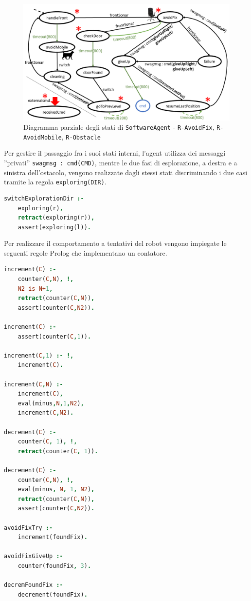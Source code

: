 \documentclass{../llncs}
\newcommand{\codescript}[1]{{\mbox{\small{\texttt{#1}}}}\xspace}
\newcommand{\code}[1]{{\color{blue}\small{\texttt{#1}}}}
\newcommand{\labelfig}[1]{\label{fig:#1}}
\begin{document}
\begin{figure}[!htb]
\centering
\includegraphics[scale=0.4]{img/stateDiagramObstacle.png}
\caption{Diagramma parziale degli stati di \texttt{SoftwareAgent} - \code{R-AvoidFix}, \code{R-AvoidMobile}, \code{R-Obstacle}}\labelfig{obstacleAvoidance}
\end{figure}

Per gestire il passaggio fra i suoi stati interni, l'agent utilizza dei messaggi ''privati'' \codescript{swagmsg : cmd(CMD)}, mentre le due fasi di esplorazione, a destra e a sinistra dell'ostacolo, vengono realizzate dagli stessi stati discriminando i due casi tramite la regola \codescript{exploring(DIR)}.\\

\begin{lstlisting}[language=Prolog, keywordstyle=\color{black}, caption={SoftwareAgent, Rules - pt2}]
switchExplorationDir :-
	exploring(r),
	retract(exploring(r)),
	assert(exploring(l)).
\end{lstlisting}

Per realizzare il comportamento a tentativi del robot vengono impiegate le seguenti regole Prolog che implementano un contatore.\\

\begin{lstlisting}[language=Prolog, keywordstyle=\color{black}, caption={SoftwareAgent, Rules - pt3}]
increment(C) :-
	counter(C,N), !,
	N2 is N+1,
	retract(counter(C,N)),
	assert(counter(C,N2)).
	
increment(C) :-
	assert(counter(C,1)).
	
increment(C,1) :- !,
	increment(C).
	
increment(C,N) :-
	increment(C),
	eval(minus,N,1,N2),
	increment(C,N2).

decrement(C) :-
	counter(C, 1), !,
	retract(counter(C, 1)).

decrement(C) :-
	counter(C,N), !,
	eval(minus, N, 1, N2),
	retract(counter(C,N)),
	assert(counter(C,N2)).

avoidFixTry :-
	increment(foundFix).

avoidFixGiveUp :-
	counter(foundFix, 3).

decremFoundFix :-
	decrement(foundFix).
\end{lstlisting}
\end{document}
